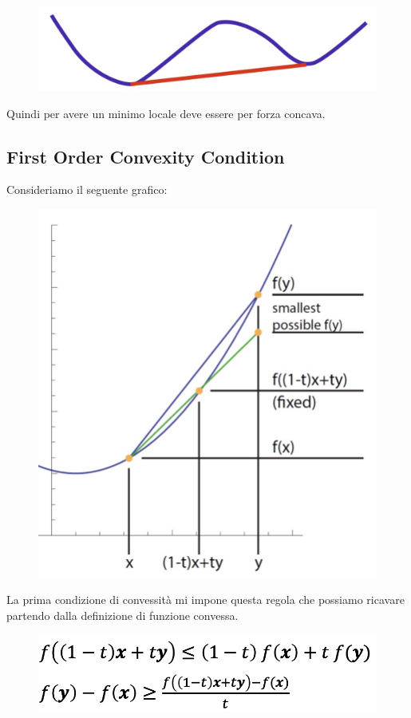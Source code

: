 \documentclass[14pt]{extreport}
\begin{document}
\begin{figure}[H]
	\centering
	\includegraphics[width=0.7\linewidth]{220.jpeg}
\end{figure}

Quindi per avere un minimo locale deve essere per forza concava.

\subsection{First Order Convexity Condition}

Consideriamo il seguente grafico:

\begin{figure}[H]
	\centering
	\includegraphics[width=0.7\linewidth]{221.jpeg}
\end{figure}

La prima condizione di convessità mi impone questa regola che possiamo ricavare partendo dalla definizione di funzione convessa.

\begin{figure}[H]
	\centering
	\includegraphics[width=0.7\linewidth]{222.jpeg}
\end{figure}
\end{document}
